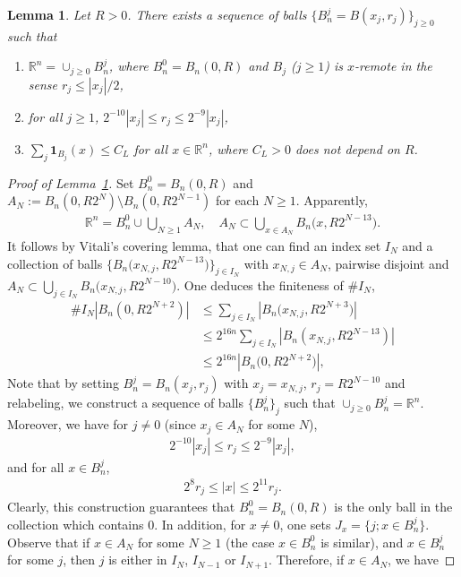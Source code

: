\documentclass[12pt]{amsart}
\theoremstyle{plain}
\newtheorem{lemma}[theorem]{Lemma}
\theoremstyle{definition}
\numberwithin{equation}{section}
\begin{document}
\begin{lemma}\label{le_remoteball}
Let $R>0$. There exists a sequence of balls $\{B_n^j = B(x_j, r_j)\}_{j \ge 0}$ such that 
\begin{enumerate}
    \item $\mathbb{R}^n = \cup_{j\ge 0} B_n^j$, where $B_n^0 = B_n(0,R)$ and $B_j$ ($j\ge 1$) is $x$-remote in the sense $r_j \le |x_j|/2$,
    \item for all $j \ge 1$, $2^{-10} |x_j| \le r_j \le 2^{-9} |x_j|$,
    \item $\sum_j \mathbf{1}_{B_j}(x) \le C_L$ for all $x\in \mathbb{R}^n$, where $C_L>0$ does not depend on $R$.
\end{enumerate}

\end{lemma}

\begin{proof}[Proof of Lemma~\ref{le_remoteball}]
Set $B_n^0 = B_n(0,R)$ and $A_N:= B_n(0, R 2^{N}) \setminus B_n(0, R 2^{N-1})$ for each $N\ge 1$. Apparently, 
\begin{align*}
    \mathbb{R}^n = B_n^0 \cup \bigcup_{N\ge 1}A_N,\quad A_N \subset \bigcup_{x\in A_N} B_n\big(x, R 2^{N-13}\big).
\end{align*}
It follows by Vitali's covering lemma, that one can find an index set $I_N$ and a collection of balls $\{B_n\big(x_{N,j},R2^{N-13}\big)\}_{j\in I_N}$ with $x_{N,j}\in A_N$, pairwise disjoint and $A_N \subset \bigcup_{j\in I_N}B_n\big(x_{N,j}, R2^{N-10}\big)$. One deduces the finiteness of $\# I_N$, 
\begin{align*}
    \# I_N |B_n(0,R 2^{N+2})| &\le \sum_{j \in I_N} |B_n\big(x_{N,j}, R2^{N+3}\big)|\\
    &\le  2^{16n} \sum_{j \in I_N} |B_n(x_{N,j}, R2^{N-13})| \\
    &\le 2^{16n}|B_n \big(0,R2^{N+2}\big)|,
\end{align*}
Note that by setting $B_n^{j} = B_n(x_{j}, r_j)$ with $x_j = x_{N,j}$, $r_j = R 2^{N-10}$ and relabeling, we construct a sequence of balls $\{B_n^j\}_j$ such that $\cup_{j \ge 0}B_n^j = \mathbb{R}^n$. Moreover, we have for $j \ne 0$ (since $x_j \in A_N$ for some $N$),
\begin{align*}
2^{-10}|x_j|\le r_j \le 2^{-9} |x_j|,
\end{align*}
and for all $x\in B_n^j$,
\begin{align*}
    2^8 r_j \le |x| \le 2^{11}r_j.
\end{align*}
Clearly, this construction guarantees that $B_n^0 = B_n(0,R)$ is the only ball in the collection which contains $0$. In addition, for $x\ne 0$, one sets $J_x = \{j; x\in B_n^j\}$. Observe that if $x\in A_N$ for some $N\ge 1$ (the case $x\in B_n^0$ is similar), and $x\in B_n^j$ for some $j$, then $j$ is either in $I_N$, $I_{N-1}$ or $I_{N+1}$. Therefore, if $x\in A_N$, we have

\end{proof}
\end{document}

